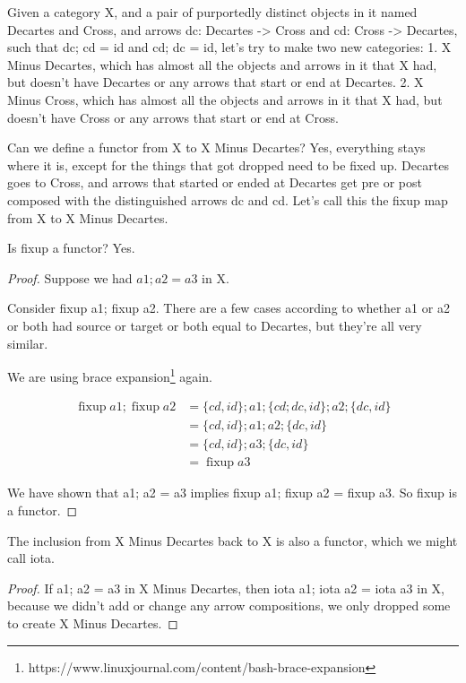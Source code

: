 \documentclass{proc-l}
\theoremstyle{definition}
\theoremstyle{remark}
\numberwithin{equation}{section}
\begin{document}
Given a category X, and a pair of purportedly distinct objects in it named Decartes and Cross,
and arrows dc: Decartes -> Cross and cd: Cross -> Decartes, 
such that dc; cd = id and cd; dc = id, let's try to make two new categories:
1. X Minus Decartes, which has almost all the objects and arrows in it that X had,
but doesn't have Decartes or any arrows that start or end at Decartes.
2. X Minus Cross, which has almost all the objects and arrows in it that X had,
but doesn't have Cross or any arrows that start or end at Cross.

Can we define a functor from X to X Minus Decartes?
Yes, everything stays where it is, except for the things that got dropped need to be fixed up.
Decartes goes to Cross, and arrows that started or ended at Decartes get pre or post composed with
the distinguished arrows dc and cd.
Let's call this the fixup map from X to X Minus Decartes.

Is fixup a functor? Yes.

\begin{proof}
Suppose we had \(a1; a2 = a3\) in X.

Consider fixup a1; fixup a2.
There are a few cases according to whether a1 or a2 or both had source or target or both equal to Decartes,
but they're all very similar.

We are using brace expansion\footnote{https://www.linuxjournal.com/content/bash-brace-expansion} again.

\begin{align*}
\operatorname{fixup} a1; \operatorname{fixup} a2 & = \{ cd, id \}; a1; \{ cd;dc, id \}; a2; \{ dc, id \} \\     %
& = \{ cd, id \}; a1; a2; \{ dc, id \} \\                              
& = \{ cd, id \}; a3; \{ dc, id \} \\                         
& = \operatorname{fixup} a3                                                              
\end{align*}

We have shown that a1; a2 = a3 implies fixup a1; fixup a2 = fixup a3. So fixup is a functor.
\end{proof}

The inclusion from X Minus Decartes back to X is also a functor, which we might call iota.

\begin{proof}
If a1; a2 = a3 in X Minus Decartes, then iota a1; iota a2 = iota a3 in X,
because we didn't add or change any arrow compositions,
we only dropped some to create X Minus Decartes.
\end{proof}
\end{document}
